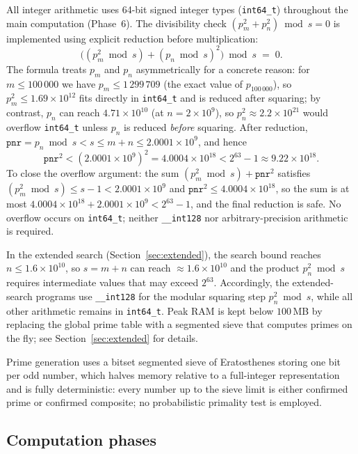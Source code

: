 \documentclass[12pt]{article}
\begin{document}
	All integer arithmetic uses 64-bit signed integer types
	(\texttt{int64\_t}) throughout the main computation (Phase~6).
	The divisibility check $(p_m^2 + p_n^2) \bmod s = 0$ is implemented
	using explicit reduction before multiplication:
	\[
	\bigl((p_m^2 \bmod s) + (p_n \bmod s)^2\bigr) \bmod s \;=\; 0.
	\]
	The formula treats $p_m$ and $p_n$ asymmetrically for a concrete
	reason: for $m \leq 100\,000$ we have $p_m \leq 1\,299\,709$
	(the exact value of $p_{100\,000}$),
	so $p_m^2 \leq 1.69 \times 10^{12}$ fits directly in \texttt{int64\_t}
	and is reduced after squaring; by contrast, $p_n$ can reach
	$4.71 \times 10^{10}$ (at $n = 2 \times 10^9$),
	so $p_n^2 \approx 2.2 \times 10^{21}$ would
	overflow \texttt{int64\_t} unless $p_n$ is reduced \emph{before}
	squaring.
	After reduction, $\mathtt{pnr} = p_n \bmod s < s \leq m + n \leq
	2.0001 \times 10^9$, and hence
	\[
	\mathtt{pnr}^2 < (2.0001 \times 10^9)^2
	= 4.0004 \times 10^{18}
	< 2^{63} - 1 \approx 9.22 \times 10^{18}.
	\]
	To close the overflow argument: the sum
	$(p_m^2 \bmod s) + \mathtt{pnr}^2$ satisfies
	$(p_m^2 \bmod s) \leq s - 1 < 2.0001 \times 10^9$
	and $\mathtt{pnr}^2 \leq 4.0004 \times 10^{18}$,
	so the sum is at most $4.0004 \times 10^{18} + 2.0001 \times 10^9
	< 2^{63} - 1$, and the final reduction is safe.
	No overflow occurs on \texttt{int64\_t}; neither \texttt{\_\_int128}
	nor arbitrary-precision arithmetic is required.

	In the extended search (Section~\ref{sec:extended}), the search bound
	reaches $n \leq 1.6 \times 10^{10}$, so
	$s = m + n$ can reach $\approx 1.6 \times 10^{10}$ and the
	product $p_n^2 \bmod s$ requires intermediate values that may exceed
	$2^{63}$.
	Accordingly, the extended-search programs use \texttt{\_\_int128}
	for the modular squaring step $p_n^2 \bmod s$, while all other
	arithmetic remains in \texttt{int64\_t}.
	Peak RAM is kept below $100$\,MB by replacing the global prime
	table with a segmented sieve that computes primes on the fly;
	see Section~\ref{sec:extended} for details.

	Prime generation uses a bitset segmented sieve of Eratosthenes
	storing one bit per odd number, which halves memory relative to a
	full-integer representation and is fully deterministic: every number
	up to the sieve limit is either confirmed prime or confirmed composite;
	no probabilistic primality test is employed.
	
	\subsection{Computation phases}
	
\end{document}
